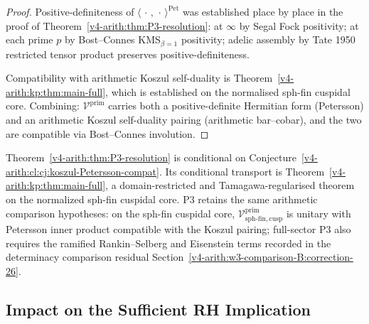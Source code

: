 \begin{proof}
Positive-definiteness of \(\langle\,\cdot\,,\,\cdot\,\rangle^{\mathrm{Pet}}\)
was established place by place in the proof of
Theorem~\ref{v4-arith:thm:P3-resolution}: at \(\infty\) by Segal
Fock positivity; at each prime \(p\) by Bost--Connes
KMS\({}_{\beta=1}\) positivity; adelic assembly by Tate 1950
restricted tensor product preserves positive-definiteness.

Compatibility with arithmetic Koszul self-duality is
Theorem~\ref{v4-arith:kp:thm:main-full}, which is established on the
normalised sph-fin cuspidal core. Combining:
\(\mathcal{V}^{\mathrm{prim}}\) carries both a positive-definite
Hermitian form (Petersson) and an arithmetic Koszul self-duality
pairing (arithmetic bar--cobar), and the two are compatible
via Bost--Connes involution.
\end{proof}

\begin{remark}
\label{v4-arith:kp:rem:P3-upgrade}
Theorem~\ref{v4-arith:thm:P3-resolution} is conditional on
Conjecture~\ref{v4-arith:cl:cj:koszul-Petersson-compat}. Its conditional transport is Theorem~\ref{v4-arith:kp:thm:main-full}, a domain-restricted
and Tamagawa-regularised theorem on the normalized sph-fin cuspidal core.
P3 retains the same arithmetic comparison hypotheses: on the sph-fin cuspidal core,
\(\mathcal{V}^{\mathrm{prim}}_{\mathrm{sph\text{-}fin,cusp}}\) is
unitary with Petersson inner product compatible with the Koszul
pairing; full-sector P3 also requires the ramified Rankin--Selberg
and Eisenstein terms recorded in the determinacy comparison residual
Section~\ref{v4-arith:w3-comparison-B:correction-26}.
\end{remark}

\subsection{Impact on the Sufficient RH Implication}
\label{v4-arith:kp:P3-unconditional:rh}

